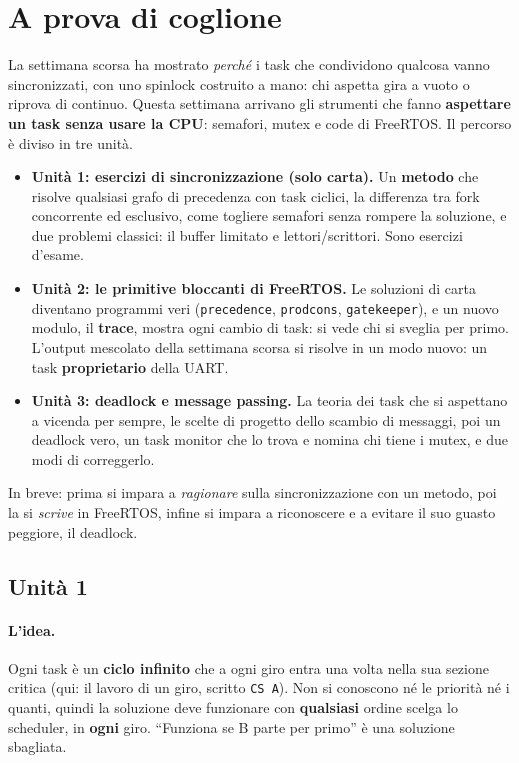 \section{A prova di coglione}
La settimana scorsa ha mostrato \emph{perché} i task che condividono qualcosa vanno sincronizzati, con uno spinlock costruito a mano: chi aspetta gira a vuoto o riprova di continuo. Questa settimana arrivano gli strumenti che fanno \textbf{aspettare un task senza usare la CPU}: semafori, mutex e code di FreeRTOS. Il percorso è diviso in tre unità.
\begin{itemize}
    \item \textbf{Unità 1: esercizi di sincronizzazione (solo carta).} Un \textbf{metodo} che risolve qualsiasi grafo di precedenza con task ciclici, la differenza tra fork concorrente ed esclusivo, come togliere semafori senza rompere la soluzione, e due problemi classici: il buffer limitato e lettori/scrittori. Sono esercizi d'esame.
    \item \textbf{Unità 2: le primitive bloccanti di FreeRTOS.} Le soluzioni di carta diventano programmi veri (\texttt{precedence}, \texttt{prodcons}, \texttt{gatekeeper}), e un nuovo modulo, il \textbf{trace}, mostra ogni cambio di task: si vede chi si sveglia per primo. L'output mescolato della settimana scorsa si risolve in un modo nuovo: un task \textbf{proprietario} della UART.
    \item \textbf{Unità 3: deadlock e message passing.} La teoria dei task che si aspettano a vicenda per sempre, le scelte di progetto dello scambio di messaggi, poi un deadlock vero, un task monitor che lo trova e nomina chi tiene i mutex, e due modi di correggerlo.
\end{itemize}
In breve: prima si impara a \emph{ragionare} sulla sincronizzazione con un metodo, poi la si \emph{scrive} in FreeRTOS, infine si impara a riconoscere e a evitare il suo guasto peggiore, il deadlock.

\subsection{Unità 1}
\paragraph*{L'idea.} Ogni task è un \textbf{ciclo infinito} che a ogni giro entra una volta nella sua sezione critica (qui: il lavoro di un giro, scritto \texttt{CS A}). Non si conoscono né le priorità né i quanti, quindi la soluzione deve funzionare con \textbf{qualsiasi} ordine scelga lo scheduler, in \textbf{ogni} giro. ``Funziona se B parte per primo'' è una soluzione sbagliata.

